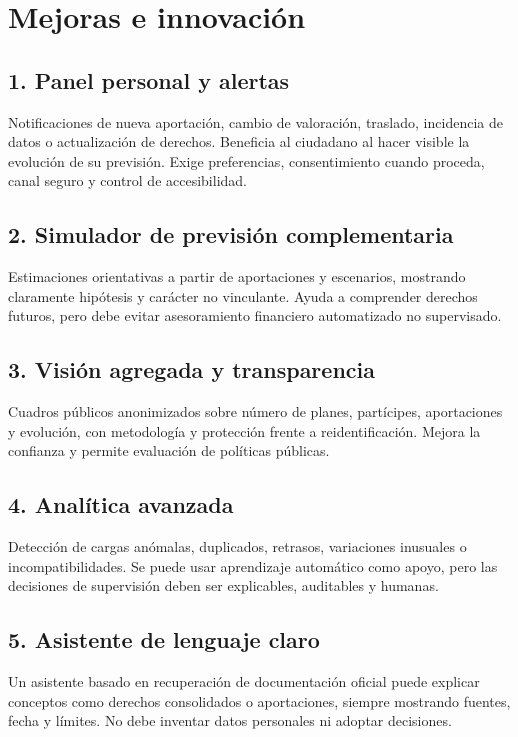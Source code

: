 \documentclass[11pt,a4paper]{article}
\begin{document}
\section{Mejoras e innovación}

\subsection{1. Panel personal y alertas}
Notificaciones de nueva aportación, cambio de valoración, traslado, incidencia de datos o actualización de derechos. Beneficia al ciudadano al hacer visible la evolución de su previsión. Exige preferencias, consentimiento cuando proceda, canal seguro y control de accesibilidad.

\subsection{2. Simulador de previsión complementaria}
Estimaciones orientativas a partir de aportaciones y escenarios, mostrando claramente hipótesis y carácter no vinculante. Ayuda a comprender derechos futuros, pero debe evitar asesoramiento financiero automatizado no supervisado.

\subsection{3. Visión agregada y transparencia}
Cuadros públicos anonimizados sobre número de planes, partícipes, aportaciones y evolución, con metodología y protección frente a reidentificación. Mejora la confianza y permite evaluación de políticas públicas.

\subsection{4. Analítica avanzada}
Detección de cargas anómalas, duplicados, retrasos, variaciones inusuales o incompatibilidades. Se puede usar aprendizaje automático como apoyo, pero las decisiones de supervisión deben ser explicables, auditables y humanas.

\subsection{5. Asistente de lenguaje claro}
Un asistente basado en recuperación de documentación oficial puede explicar conceptos como derechos consolidados o aportaciones, siempre mostrando fuentes, fecha y límites. No debe inventar datos personales ni adoptar decisiones.
\end{document}
